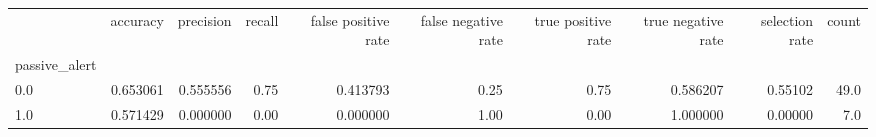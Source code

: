 \begin{tabular}{lrrrrrrrrr}
\toprule
{} &  accuracy &  precision &  recall &  false positive rate &  false negative rate &  true positive rate &  true negative rate &  selection rate &  count \\
passive\_alert &           &            &         &                      &                      &                     &                     &                 &        \\
\midrule
0.0           &  0.653061 &   0.555556 &    0.75 &             0.413793 &                 0.25 &                0.75 &            0.586207 &         0.55102 &   49.0 \\
1.0           &  0.571429 &   0.000000 &    0.00 &             0.000000 &                 1.00 &                0.00 &            1.000000 &         0.00000 &    7.0 \\
\bottomrule
\end{tabular}
